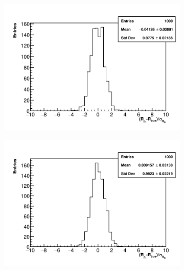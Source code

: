\begin{figure}[]
\centering
    \begin{subfigure}[t]{0.45\textwidth}
        \centering
        \includegraphics[width=\textwidth]{Rpull_TMethod}
        \caption{}
    \end{subfigure}
    \hspace{1mm}
    \begin{subfigure}[t]{0.45\textwidth}
        \centering
        \includegraphics[width=\textwidth]{Rpull_AMethod}
        \caption{}
    \end{subfigure}%


\end{figure}
